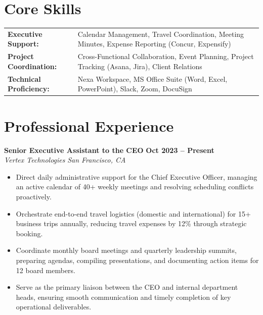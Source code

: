 \documentclass[10pt]{article}
\begin{document}
\section*{Core Skills}
\noindent
\begin{tabularx}{\textwidth}{@{} l X @{}}
  \textbf{Executive Support:} & Calendar Management, Travel Coordination, Meeting Minutes, Expense Reporting (Concur, Expensify) \\
  \textbf{Project Coordination:} & Cross-Functional Collaboration, Event Planning, Project Tracking (Asana, Jira), Client Relations \\
  \textbf{Technical Proficiency:} & Nexa Workspace, MS Office Suite (Word, Excel, PowerPoint), Slack, Zoom, DocuSign
\end{tabularx}

\section*{Professional Experience}

\noindent
\textbf{Senior Executive Assistant to the CEO} \hfill \textbf{Oct 2023 -- Present} \\
\textit{Vertex Technologies} \hfill \textit{San Francisco, CA}
\begin{itemize}
  \item Direct daily administrative support for the Chief Executive Officer, managing an active calendar of 40+ weekly meetings and resolving scheduling conflicts proactively.
  \item Orchestrate end-to-end travel logistics (domestic and international) for 15+ business trips annually, reducing travel expenses by 12\% through strategic booking.
  \item Coordinate monthly board meetings and quarterly leadership summits, preparing agendas, compiling presentations, and documenting action items for 12 board members.
  \item Serve as the primary liaison between the CEO and internal department heads, ensuring smooth communication and timely completion of key operational deliverables.
\end{itemize}

\vspace{3pt}
\end{document}
